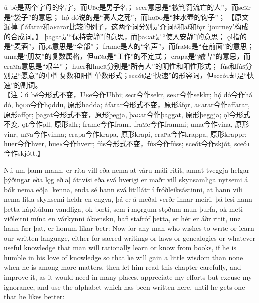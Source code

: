 \begin{translation*}{}
    ú bé是两个字母的名字，而U\textsc{b}e是男子名；
    secr意思是“被判罚流亡的人”，而se\textsc{k}r是“袋子”的意思；
    hǫ́ dó说的是“高人之死”，而hǫ\textsc{d}o是“挂水壶的钩子”；
    【原文漏掉了áfarar和a\textsc{f}arar比较的例子，这两个词分别是介词á和af和fǫr `journey'构成的合成词。】
    þagat是“保持安静”的意思，而þa\textsc{g}at是“使人安静”的意思；
    ǫl指的是“麦酒”，而ǫ\textsc{l}意思是“全部”；
    frame是人的“名声”，而fra\textsc{m}e是“在前面”的意思；
    uına是“朋友”的复数属格，但uı\textsc{n}a是“工作”的不定式；
    crapa是“融雪”的意思，而cra\textsc{m}a意思是“艰辛”； huer和hue\textsc{r}分别是“所有人”的阴性和阳性形式；
    fús和fú\textsc{s}分别是“愿意”的中性复数和阳性单数形式；sceót是“快速”的形容词，但sceó\textsc{t}却是“快速”的副词。\\

    【注：ú bé今形式不变，U\textsc{b}e今作Ubbi;
    secr今作sekr, se\textsc{k}r今作sekkr;
    h\'{ǫ} dó今作há dó, hǫ\textsc{d}o今作hǫddu, 原形hadda;
    áfarar今形式不变，原形áfǫr, a\textsc{f}arar今作affarar, 原形affǫr;
    þagat今形式不变，原形þegja, þa\textsc{g}at今作þaggat, 原形þeggja;
    ǫl今形式不变, ǫ\textsc{l}今作ǫll, 原形allr;
    frame今作frami, fra\textsc{m}e今作frammi;
    uına今作vina, 原形vinr, uı\textsc{n}a今作vinna; crapa今作krapa, 原形krapi, cra\textsc{p}a今作krappa, 原形krappr;
    huer今作hver, hue\textsc{r}今作hverr;
    fús今形式不变，fú\textsc{s}今作fúss;
    sceót今作skjót, sceó\textsc{t}今作skjótt.】
\end{translation*}
\begin{paracol}{2}
    Nú um þann mann, er ríta vill eða nema at váru máli ritit, annat tveggja helgar þýðingar eða lǫg eð[a] áttvísi eða svá hverigi er maðr vill skynsamliga nytsemi á bók nema eð[a] kenna, enda sé hann svá litillátr í fróðleiksástinni, at hann vili nema lítla skynsemi heldr en engva, þá er á meðal verðr innar meiri, þá lesi hann þetta kápítúlum vandliga, ok bœti, sem í mǫrgum stǫðum mun þurfa, ok meti viðleitni mína en várkynni ókœnsku, hafi stafróf þetta, er hér er áðr ritit, unz hann fær þat, er honum líkar betr:
    \switchcolumn
    Now for any man who wishes to write or learn our written language, either for sacred writings or laws or genealogies or whatever useful knowledge that man will rationally learn or know from books, if he is humble in his love of knowledge so that he will gain a little wisdom than none when he is among more matters, then let him read this chapter carefully, and improve it, as it would need in many places, appreciate my efforts but excuse my ignorance, and use the alphabet which has been written here, until he gets one that he likes better:
\end{paracol}
